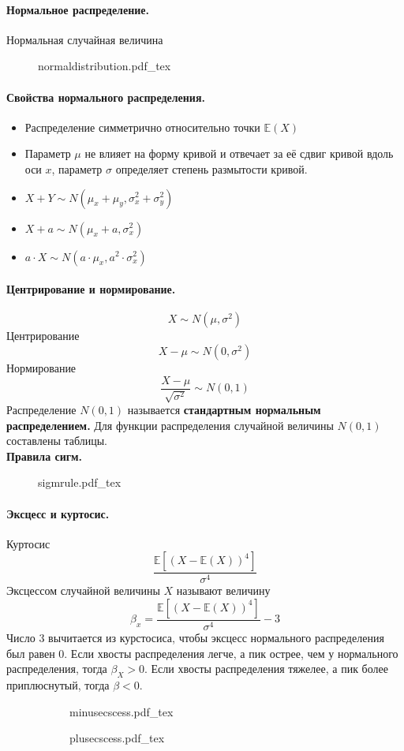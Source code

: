 \documentclass{article}
\newcommand{\E}{\mathbb{E}}
\newcommand{\incfig}[2][1]{%
    \def\svgwidth{#1\columnwidth}
    {#2.pdf_tex}
}
\begin{document}
\paragraph{Нормальное распределение.}
Нормальная случайная величина
\begin{figure}[h]
  \centering
  \incfig{normaldistribution}
\end{figure}
\paragraph{Свойства нормального распределения.}
\begin{itemize}
  \item Распределение симметрично относительно точки $\E(X)$
  \item Параметр $\mu$ не влияет на форму кривой и отвечает за её сдвиг кривой вдоль оси $x$, параметр $\sigma$ определяет степень размытости кривой.
  \item $X+Y \sim N(\mu_x+\mu_y,\sigma_x^2 + \sigma_y^2)$
  \item $X+a \sim N(\mu_x + a, \sigma_x^2)$
  \item $a \cdot X \sim N(a\cdot \mu_x, a^2 \cdot \sigma_x^2)$
\end{itemize}
\paragraph{Центрирование и нормирование.}
\[
X \sim N(\mu,\sigma^2)
\]
Центрирование
\[
X - \mu \sim N(0,\sigma^2)
\]
Нормирование
\[
\frac{X - \mu}{\sqrt{\sigma^2}} \sim N(0,1)
\]
Распределение $N(0,1)$ называется {\bf стандартным нормальным распределением.} Для функции распределения случайной величины $N(0,1)$ составлены таблицы.
\\
{\bf Правила сигм.}
\begin{figure}[h!]
  \centering
  \incfig{sigmrule}
\end{figure}
\paragraph{Эксцесс и куртосис.}
Куртосис
\[
\frac{\E[(X-\E(X))^4]}{\sigma^4}
\]
Эксцессом случайной величины $X$ называют величину
\[
\beta_x=\frac{\E[(X-\E(X))^4]}{\sigma^4} -3
\]
Число 3 вычитается из курстосиса, чтобы эксцесс нормального распределения был равен 0. Если хвосты распределения легче, а пик острее, чем у нормального распределения, тогда $\beta_X>0$. Если хвосты распределения тяжелее, а пик более приплюснутый, тогда $\beta<0$.
\begin{figure}[h!]
  \centering
  \begin{subfigure}[b]{0.49\linewidth}
    \incfig{minusecscess}
  \end{subfigure}
  \begin{subfigure}[b]{0.49\linewidth}
    \incfig{plusecscess}
  \end{subfigure}
\end{figure}
\end{document}
